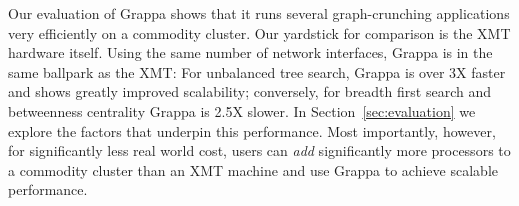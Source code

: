 Our evaluation of Grappa shows that it runs several graph-crunching 
applications very efficiently
on a commodity cluster. Our yardstick for comparison is the XMT hardware
itself. Using the same number of network interfaces, Grappa is in the
same ballpark as the XMT: For unbalanced tree search, Grappa is over 3X
faster and shows greatly improved scalability; conversely, for breadth
first search and betweenness centrality Grappa is 2.5X slower.  In
Section~\ref{sec:evaluation} we explore the factors that underpin this
performance. Most importantly, however, for significantly less real
world cost, users can \emph{add\/} significantly more processors to a
commodity cluster than an XMT machine and use Grappa to achieve scalable
performance.

% 


